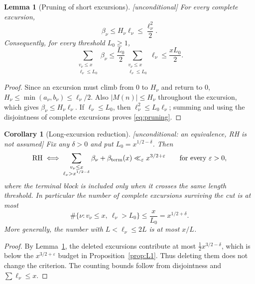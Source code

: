 \documentclass[11pt,reqno]{amsart}
\theoremstyle{plain}
\newtheorem{lemma}[theorem]{Lemma}
\newtheorem{corollary}[theorem]{Corollary}
\theoremstyle{definition}
\newcommand{\eps}{\varepsilon}
\begin{document}
\begin{lemma}[Pruning of short excursions]
\label{lem:pruning}
\emph{[unconditional]} For every complete excursion,
\begin{equation}
\label{eq:trivial-beta}
  \beta_\nu\le H_\nu\ell_\nu\le \frac{\ell_\nu^2}{2}.
\end{equation}
Consequently, for every threshold $L_0\ge1$,
\begin{equation}
\label{eq:pruning}
  \sum_{\substack{v_\nu\le x\\ \ell_\nu\le L_0}}\beta_\nu
  \le \frac{L_0}{2}\sum_{\substack{v_\nu\le x\\ \ell_\nu\le L_0}}\ell_\nu
  \le \frac{xL_0}{2}.
\end{equation}
\end{lemma}

\begin{proof}
Since an excursion must climb from $0$ to $H_\nu$ and return to $0$,
$H_\nu\le\min(a_\nu,b_\nu)\le\ell_\nu/2$. Also
$|M(n)|\le H_\nu$ throughout the excursion, which gives
$\beta_\nu\le H_\nu\ell_\nu$. If $\ell_\nu\le L_0$, then
$\ell_\nu^2\le L_0\ell_\nu$; summing and using the disjointness of
complete excursions proves \eqref{eq:pruning}.
\end{proof}

\begin{corollary}[Long-excursion reduction]
\label{cor:long-reduction}
\emph{[unconditional: an equivalence, RH is not assumed]} Fix any
$\delta>0$ and put $L_0=x^{1/2-\delta}$. Then
\begin{equation}
\label{eq:long-reduction}
  \mathrm{RH}
  \iff
  \sum_{\substack{v_\nu\le x\\
                      \ell_\nu>x^{1/2-\delta}}}\beta_\nu
  +\beta_{\rm term}(x)
  \ll_\eps x^{3/2+\eps}
  \qquad\text{for every }\eps>0,
\end{equation}
where the terminal block is included only when it crosses the same length
threshold. In particular the number of complete excursions surviving the
cut is at most
\begin{equation}
\label{eq:number-long}
  \#\{\nu:v_\nu\le x,\ \ell_\nu>L_0\}\le \frac{x}{L_0}
  =x^{1/2+\delta}.
\end{equation}
More generally, the number with $L<\ell_\nu\le2L$ is at most $x/L$.
\end{corollary}

\begin{proof}
By Lemma~\ref{lem:pruning}, the deleted excursions contribute at most
$\tfrac12x^{3/2-\delta}$, which is below the $x^{3/2+\eps}$ budget in
Proposition~\ref{prop:L1}. Thus deleting them does not change the
criterion. The counting bounds follow from disjointness and
$\sum\ell_\nu\le x$.
\end{proof}
\end{document}
